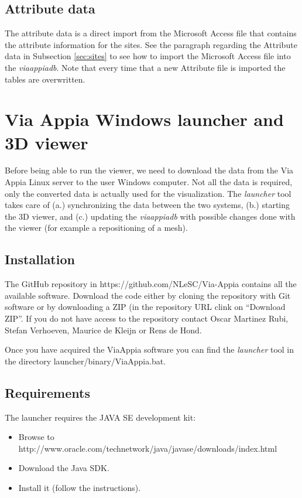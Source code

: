 \documentclass[a4paper,11pt]{article}
\begin{document}
\subsection{Attribute data}

The attribute data is a direct import from the Microsoft Access file that contains the attribute information for the sites. See the paragraph regarding the Attribute data in Subsection \ref{sec:sites} to see how to import the Microsoft Access file into the \textit{viaappiadb}. Note that every time that a new Attribute file is imported the tables are overwritten.

\section{Via Appia Windows launcher and 3D viewer}
\label{sec:viewer}

Before being able to run the viewer, we need to download the data from the Via Appia Linux server to the user Windows computer. Not all the data is required, only the converted data is actually used for the visualization. The \textit{launcher} tool takes care of (a.) synchronizing the data between the two systems, (b.) starting the 3D viewer, and (c.) updating the \textit{viaappiadb} with possible changes done with the viewer (for example a repositioning of a mesh).

\subsection{Installation}
\label{sec:install}

The GitHub repository in https://github.com/NLeSC/Via-Appia contains all the available software. Download the code either by cloning the repository with Git software or by downloading a ZIP (in the repository URL clink on ``Download ZIP''. If you do not have access to the repository contact Oscar Martinez Rubi, Stefan Verhoeven, Maurice de Kleijn or Rens de Hond.

Once you have acquired the ViaAppia software you can find the \textit{launcher} tool in the directory launcher/binary/ViaAppia.bat. 

\subsection{Requirements}

The launcher requires the JAVA SE development kit:
\begin{itemize}
\item Browse to http://www.oracle.com/technetwork/java/javase/downloads/index.html
\item Download the Java SDK.
\item Install it (follow the instructions).
\end{itemize} 
\end{document}
